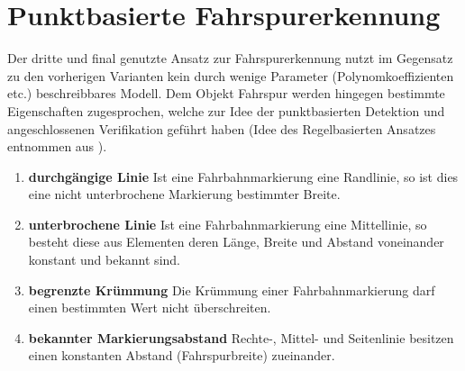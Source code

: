 \chapter{Punktbasierte Fahrspurerkennung \dcsecondauthorshort} 
\label{sec:fahrspurerkennung:riverflow}

Der dritte und final genutzte Ansatz zur Fahrspurerkennung nutzt im Gegensatz zu den vorherigen Varianten kein durch wenige Parameter (Polynomkoeffizienten etc.) beschreibbares Modell. Dem Objekt Fahrspur werden hingegen bestimmte Eigenschaften zugesprochen, welche zur Idee der punktbasierten Detektion und angeschlossenen Verifikation geführt haben (Idee des Regelbasierten Ansatzes entnommen aus \autocite[35-39]{drauschkeEchtzeitfaehigeStartpunktalgorithmenFuer2016}).
\begin{enumerate}
\item \label{item:riverflow:rule:solidline}
\textbf{durchgängige Linie}
Ist eine Fahrbahnmarkierung eine Randlinie, so ist dies eine nicht unterbrochene Markierung bestimmter Breite.
\item \label{item:riverflow:rule:dashedline}
\textbf{unterbrochene Linie}
Ist eine Fahrbahnmarkierung eine Mittellinie, so besteht diese aus Elementen deren Länge, Breite und Abstand voneinander konstant und bekannt sind.
\item \label{item:riverflow:rule:curvature}
\textbf{begrenzte Krümmung}
Die Krümmung einer Fahrbahnmarkierung darf einen bestimmten Wert nicht überschreiten.
\item \label{item:riverflow:rule:distance}
\textbf{bekannter Markierungsabstand}
Rechte-, Mittel- und Seitenlinie besitzen einen konstanten Abstand (Fahrspurbreite) zueinander.
\end{enumerate}
